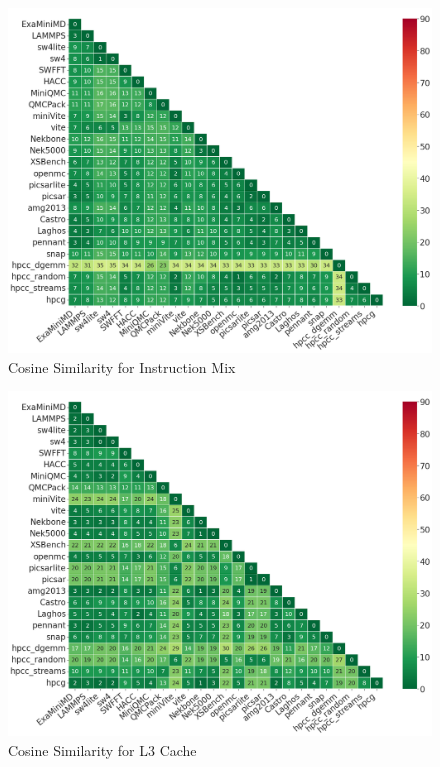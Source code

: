 \documentclass[conference]{IEEEtran}
\begin{document}
\begin{figure}[ht]
\centering
\includegraphics[width=0.9\linewidth]{figs/Instruction_Mix.png}
\caption{Cosine Similarity for Instruction Mix }
\label{figs:cosine Instruction_Mix}
\end{figure}

\begin{figure}[ht]
\centering
\includegraphics[width=0.9\linewidth]{figs/L3_D_Cache.png}
\caption{Cosine Similarity for L3 Cache }
\label{figs:L3_D_Cache}
\end{figure}
\end{document}
